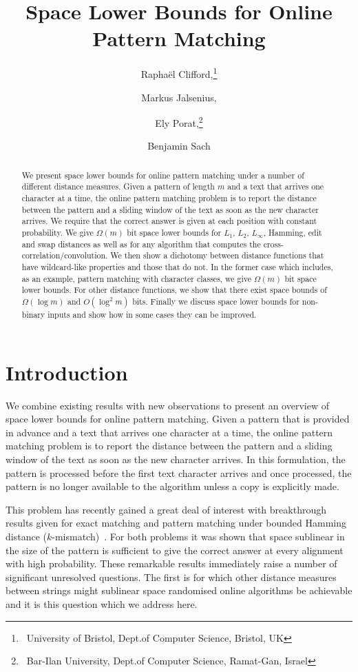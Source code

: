 \documentclass{article}
\title{Space Lower Bounds for Online Pattern Matching}
\author{
    Rapha\"{e}l Clifford,\thanks{~University of Bristol, Dept.\@ of Computer Science, Bristol, UK}
    \and Markus Jalsenius,\footnotemark[1]\\
    \and Ely Porat,\thanks{~Bar-Ilan University, Dept.\@ of Computer Science, Ramat-Gan, Israel}
    \and Benjamin Sach\footnotemark[1]}
\date{}
\theoremstyle{plain}
\theoremstyle{definition}
\begin{document}
\maketitle

\begin{abstract}
    We present space lower bounds for online pattern matching under a number of different distance measures. Given a pattern of length $m$ and a text that arrives one character at a time, the online pattern matching problem is to report the distance between the pattern and a sliding window of the text as soon as the new character arrives. We require that the correct answer is given at each position with constant probability. We give $\Omega(m)$ bit space lower bounds for $L_1$, $L_2$, $L_{\infty}$, Hamming, edit and swap distances as well as for any algorithm that computes the cross-correlation/convolution. We then show a dichotomy between distance functions that have wildcard-like properties and those that do not. In the former case which includes, as an example, pattern matching with character classes, we give $\Omega(m)$ bit space lower bounds. For other distance functions, we show that there exist space bounds of $\Omega(\log m)$ and $O(\log^2 m)$ bits. Finally we discuss space lower bounds for non-binary inputs and show how in some cases they can be improved.
\end{abstract}


\section{Introduction}
We combine existing results with new observations to present an overview of space lower bounds for online pattern matching.  Given a pattern that is provided in advance and a text that arrives one character at a time, the online pattern matching problem is to report the distance between the pattern and a sliding window of the text as soon as the new character arrives. In this formulation, the pattern is processed before the first text character arrives and once processed, the pattern is no longer available to the algorithm unless a copy is explicitly made.

This problem has recently gained a great deal of interest with breakthrough results
 given for exact matching and pattern matching under bounded
Hamming distance ($k$-mismatch)~\cite{Porat:09}.
For both problems it was shown that space sublinear in the size of the pattern is sufficient to give the correct answer at every alignment with high probability.  These remarkable results immediately raise a number of significant unresolved questions. The first is for which other distance measures between strings might sublinear space randomised online algorithms be achievable and it is this question which we address here.
\end{document}
